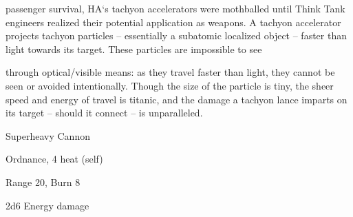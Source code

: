 passenger survival, HA‘s tachyon accelerators were mothballed until Think Tank engineers realized their
potential application as weapons. A tachyon accelerator projects tachyon particles -- essentially a
subatomic localized object -- faster than light towards its target. These particles are impossible to see

through optical/visible means: as they travel faster than light, they cannot be seen or avoided intentionally.
Though the size of the particle is tiny, the sheer speed and energy of travel is titanic, and the damage a
tachyon lance imparts on its target -- should it connect -- is unparalleled.

Superheavy Cannon

Ordnance, 4 heat (self)

Range 20, Burn 8

2d6 Energy damage

